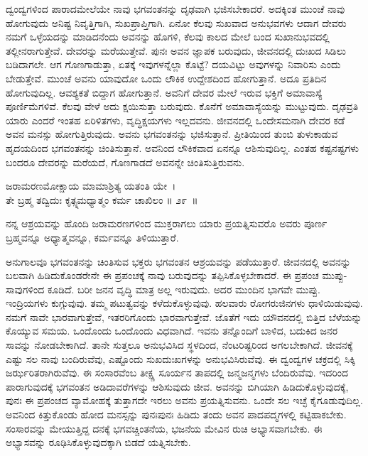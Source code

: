 ದ್ವಂದ್ವಗಳಿಂದ ಪಾರಾದಮೇಲೆಯೇ ನಾವು ಭಗವಂತನನ್ನು ದೃಢವಾಗಿ ಭಜಿಸಬೇಕಾದರೆ. ಅದಕ್ಕಿಂತ ಮುಂಚೆ ನಾವು ಹೋಗುವುದು ಅನಿಷ್ಟ ನಿವೃತ್ತಿಗಾಗಿ, ಸುಖಪ್ರಾಪ್ತಿಗಾಗಿ. ಏನೋ ಕೆಲವು ಸುಖವಾದ ಅನುಭವಗಳು ಆದಾಗ ದೇವರು ನಮಗೆ ಒಳ್ಳೆಯದನ್ನು ಮಾಡಿದನೆಂದು ಅವನನ್ನು ಹೊಗಳಿ, ಕೆಲವು ಕಾಲದ ಮೇಲೆ ಬಂದ ಸುಖಾನುಭವದಲ್ಲಿ ತಲ್ಲೀನರಾಗುತ್ತೇವೆ. ದೇವರನ್ನು ಮರೆಯುತ್ತೇವೆ. ಪುನಃ ಅವನ ಜ್ಞಾಪಕ ಬರುವುದು, ಜೀವನದಲ್ಲಿ ದುಃಖದ ಸಿಡಿಲು ಬಡಿದಾಗಲೇ. ಆಗ ಗೊಣಗಾಡುತ್ತಾ, ಏತಕ್ಕೆ ಇವುಗಳನ್ನೆಲ್ಲಾ ಕೊಟ್ಟೆ? ದಯವಿಟ್ಟು ಅವುಗಳನ್ನು ನಿವಾರಿಸು ಎಂದು ಬೇಡುತ್ತೇವೆ. ಮುಂಚೆ ಅವನು ಯಾವುದೋ ಒಂದು ಲೌಕಿಕ ಉದ್ದೇಶದಿಂದ ಹೋಗುತ್ತಾನೆ. ಅದೂ ಪ್ರತಿದಿನ ಹೋಗುವುದಿಲ್ಲ. ಆವಶ್ಯಕತೆ ಬಿದ್ದಾಗ ಹೋಗುತ್ತಾನೆ. ಅವನಿಗೆ ದೇವರ ಮೇಲೆ ಇರುವ ಭಕ್ತಿಗೆ ಅಮಾವಾಸ್ಯೆ ಪೂರ್ಣಿಮೆಗಳಿವೆ. ಕೆಲವು ವೇಳೆ ಅದು ಕ್ಷಯಿಸುತ್ತಾ ಬರುವುದು. ಕೊನೆಗೆ ಅಮಾವಾಸ್ಯೆಯನ್ನು ಮುಟ್ಟುವುದು. ದೃಢವ್ರತಿ ಯಾರು ಎಂದರೆ ಇಂತಹ ಏರಿಳಿತಗಳು, ವೃದ್ಧಿಕ್ಷಯಗಳು ಇಲ್ಲದವನು. ಜೀವನದಲ್ಲಿ ಒಂದೇಸಮನಾಗಿ ದೇವರ ಕಡೆ ಅವನ ಮನಸ್ಸು ಹೋಗುತ್ತಿರುವುದು. ಅವನು ಭಗವಂತನನ್ನು ಭಜಿಸುತ್ತಾನೆ. ಪ್ರೀತಿಯಿಂದ ತುಂಬಿ ತುಳುಕಾಡುವ ಹೃದಯದಿಂದ ಭಗವಂತನನ್ನು ಚಿಂತಿಸುತ್ತಾನೆ. ಅವನಿಂದ ಲೌಕಿಕವಾದ ಏನನ್ನೂ ಆಶಿಸುವುದಿಲ್ಲ. ಎಂತಹ ಕಷ್ಟನಷ್ಟಗಳು ಬಂದರೂ ದೇವರನ್ನು ಮರೆಯದೆ, ಗೊಣಗಾಡದೆ ಅವನನ್ನೇ ಚಿಂತಿಸುತ್ತಿರುವನು.

\begin{shloka}
ಜರಾಮರಣಮೋಕ್ಷಾಯ ಮಾಮಾಶ್ರಿತ್ಯ ಯತಂತಿ ಯೇ~।\\ತೇ ಬ್ರಹ್ಮ ತದ್ವಿದುಃ ಕೃತ್ಸ್ನಮಧ್ಯಾತ್ಮಂ ಕರ್ಮ ಚಾಖಿಲಂ \hfill॥ ೨೯~॥
\end{shloka}

\begin{artha}
ನನ್ನ ಆಶ್ರಯವನ್ನು ಹೊಂದಿ ಜರಾಮರಣಗಳಿಂದ ಮುಕ್ತರಾಗಲು ಯಾರು ಪ್ರಯತ್ನಿಸುವರೊ ಅವರು ಪೂರ್ಣ ಬ್ರಹ್ಮವನ್ನೂ ಅಧ್ಯಾತ್ಮವನ್ನೂ, ಕರ್ಮವನ್ನೂ ತಿಳಿಯುತ್ತಾರೆ.
\end{artha}

ಅನುಗಾಲವೂ ಭಗವಂತನನ್ನು ಚಿಂತಿಸುವ ಭಕ್ತರು ಭಗವಂತನ ಆಶ್ರಯವನ್ನು ಪಡೆಯುತ್ತಾರೆ. ಜೀವನದಲ್ಲಿ ಅವನನ್ನು ಬಲವಾಗಿ ಹಿಡಿದುಕೊಂಡರೇನೇ ಈ ಪ್ರಪಂಚಕ್ಕೆ ನಾವು ಬರುವುದನ್ನು ತಪ್ಪಿಸಿಕೊಳ್ಳಬೇಕಾದರೆ. ಈ ಪ್ರಪಂಚ ಮುಪ್ಪು-ಸಾವುಗಳಿಂದ ಕೂಡಿದೆ. ಬರೀ ಜನನ ವೃದ್ಧಿ ಮಾತ್ರ ಅಲ್ಲ ಇರುವುದು. ಅದರ ಮುಂದಿನ ಭಾಗವೇ ಮುಪ್ಪು. ಇಂದ್ರಿಯಗಳು ಕುಗ್ಗುವುವು. ತಮ್ಮ ಪಟುತ್ವವನ್ನು ಕಳೆದುಕೊಳ್ಳುವುವು. ಹಲವಾರು ರೋಗರುಜಿನಗಳು ಧಾಳಿಯಿಡುವುವು. ನಮಗೆ ನಾವೇ ಭಾರವಾಗುತ್ತೇವೆ, ಇತರರಿಗೊಂದು ಭಾರವಾಗುತ್ತೇವೆ. ಜೊತೆಗೆ ಇದು ಯೌವನದಲ್ಲಿ ಬಿತ್ತಿದ ಬೆಳೆಯನ್ನು ಕೊಯ್ಯುವ ಸಮಯ. ಒಂದೊಂದು ಒಂದೊಂದು ವಿಧವಾಗಿದೆ. ಇವನು ತನ್ನೊಂದಿಗೆ ಬಾಳಿದ, ಬದುಕಿದ ಜನರ ಸಾವನ್ನು ನೋಡಬೇಕಾಗಿದೆ. ತಾನೇ ಸುತ್ತಲೂ ಅನುಭವಿಸಿದ ಸ್ಥಳದಿಂದ, ನೆಂಟರಿಷ್ಟರಿಂದ ಅಗಲಬೇಕಾಗಿದೆ. ಜೀವನಕ್ಕೆ ಎಷ್ಟು ಸಲ ನಾವು ಬಂದಿರುವೆವು, ಎಷ್ಟೊಂದು ಸುಖದುಃಖಗಳನ್ನು ಅನುಭವಿಸಿರುವೆವು. ಈ ದ್ವಂದ್ವಗಳ ಚಕ್ರದಲ್ಲಿ ಸಿಕ್ಕಿ ಜರ್ಝರಿತರಾಗಿರುವೆವು. ಈ ಸಂಸಾರವೆಂಬ ತೀಕ್ಷ್ಣ ಸೂರ್ಯನ ತಾಪದಲ್ಲಿ ಜನ್ಮಜನ್ಮಗಳು ಬೆಂದಿರುವೆವು. ಇದರಿಂದ ಪಾರಾಗುವುದಕ್ಕೆ ಭಗವಂತನ ಅಡಿದಾವರೆಗಳನ್ನು ಆಶಿಸುವುದು ಜೀವ. ಅವನನ್ನು ಬಿಗಿಯಾಗಿ ಹಿಡಿದುಕೊಳ್ಳುವುದಕ್ಕೆ, ಪುನಃ ಈ ಪ್ರಪಂಚದ ವ್ಯಾಮೋಹಕ್ಕೆ ತುತ್ತಾಗದೇ ಇರಲು ಅವನು ಪ್ರಯತ್ನಿಸುವನು. ಒಂದೇ ಸಲ ಇಚ್ಛೆ ಕೈಗೂಡುವುದಿಲ್ಲ. ಅವನಿಂದ ಕಿತ್ತುಕೊಂಡು ಹೋದ ಮನಸ್ಸನ್ನು ಪುನಃಪುನಃ ಹಿಡಿದು ತಂದು ಅವನ ಪಾದಪದ್ಮಗಳಲ್ಲಿ ಕಟ್ಟಿಹಾಕಬೇಕು. ಸಂಸಾರವನ್ನು ಮೇಯುತ್ತಿದ್ದ ದನಕ್ಕೆ ಭಗವಚ್ಚಿಂತನೆಯ, ಭಜನೆಯ ಮೇವಿನ ರುಚಿ ಅಭ್ಯಾಸವಾಗಬೇಕು. ಈ ಅಭ್ಯಾಸವನ್ನು ರೂಢಿಸಿಕೊಳ್ಳುವುದಕ್ಕಾಗಿ ಬಿಡದೆ ಯತ್ನಿಸಬೇಕು.

